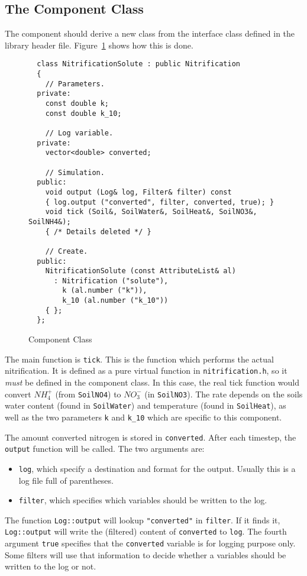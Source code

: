 \documentclass{article}
\newcommand{\code}[1]{\texttt{#1}}
\newcommand{\file}[1]{\texttt{#1}}
\newcommand{\ammonium}{\mbox{$NH_4^+$}}
\newcommand{\nitrate}{\mbox{$NO_3^-$}}
\begin{document}
\subsection{The Component Class}

The component should derive a new class from the interface class
defined in the library header file.  Figure~\ref{fig:component-class}
shows how this is done. 

\begin{figure}[htbp]
\begin{verbatim}
  class NitrificationSolute : public Nitrification
  {
    // Parameters.
  private: 
    const double k;
    const double k_10;
  
    // Log variable.
  private:
    vector<double> converted;
    
    // Simulation.
  public:
    void output (Log& log, Filter& filter) const
    { log.output ("converted", filter, converted, true); }
    void tick (Soil&, SoilWater&, SoilHeat&, SoilNO3&, SoilNH4&);
    { /* Details deleted */ }
  
    // Create.
  public:
    NitrificationSolute (const AttributeList& al)
      : Nitrification ("solute"),
        k (al.number ("k")),
        k_10 (al.number ("k_10"))
    { };
  };
\end{verbatim}
  \caption{Component Class}
  \label{fig:component-class}
\end{figure}

The main function is \code{tick}.  This is the function which performs
the actual nitrification.  It is defined as a pure virtual function in
\file{nitrification.h}, so it \emph{must} be defined in the component
class.  In this case, the real tick function would convert \ammonium{}
(from \code{SoilNO4}) to \nitrate{} (in \code{SoilNO3}).  The rate
depends on the soils water content (found in \code{SoilWater}) and
temperature (found in \code{SoilHeat}), as well as the two parameters
\code{k} and \code{k\_10} which are specific to this component.  

The amount converted nitrogen is stored in \code{converted}.  After
each timestep, the \code{output} function will be called.  The two
arguments are:
\begin{itemize}
\item \code{log}, which specify a destination and format for the
  output.  Usually this is a log file full of parentheses.
\item \code{filter}, which specifies which variables should be written
  to the log.
\end{itemize}
The function \code{Log::output} will lookup \code{"converted"} in
\code{filter}.  If it finds it, \code{Log::output} will write the
(filtered) content of \code{converted} to \code{log}.  The fourth
argument \code{true} specifies that the \code{converted} variable is
for logging purpose only.  Some filters will use that information to
decide whether a variables should be written to the log or not.
\end{document}
